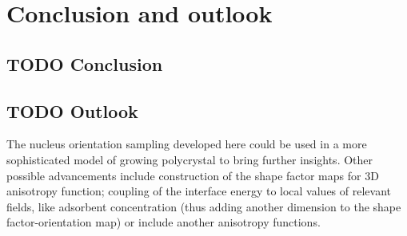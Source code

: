 \chapter{Conclusion and outlook}
\section{TODO Conclusion}
	
\section{TODO Outlook}
The nucleus orientation sampling developed here could be used in a more sophisticated model of growing polycrystal to bring further insights. Other possible advancements include construction of the shape factor maps for 3D anisotropy function; coupling of the interface energy to local values of relevant fields, like adsorbent concentration (thus adding another dimension to the shape factor-orientation map) or include another anisotropy functions.
\cleardoublepage

